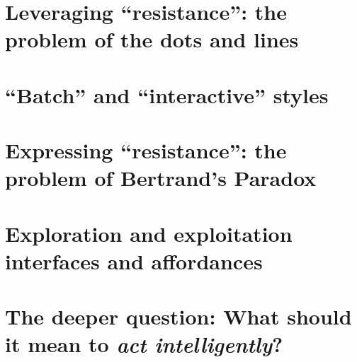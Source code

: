 \section{Leveraging ``resistance'': the problem of the dots and lines}\hypertarget{leveraging-resistance-the-problem-of-the-dots-and-lines}{}\label{leveraging-resistance-the-problem-of-the-dots-and-lines}

\section{``Batch'' and ``interactive'' styles}\hypertarget{batch-and-interactive-styles}{}\label{batch-and-interactive-styles}

\section{Expressing ``resistance'': the problem of Bertrand's Paradox}\hypertarget{expressing-resistance-the-problem-of-bertrands-paradox}{}\label{expressing-resistance-the-problem-of-bertrands-paradox}

\section{Exploration and exploitation interfaces and affordances}\hypertarget{exploration-and-exploitation-interfaces-and-affordances}{}\label{exploration-and-exploitation-interfaces-and-affordances}

\section{The deeper question: What should it mean to \emph{act intelligently}?}\hypertarget{the-deeper-question-what-should-it-mean-to-act-intelligently}{}\label{the-deeper-question-what-should-it-mean-to-act-intelligently}

